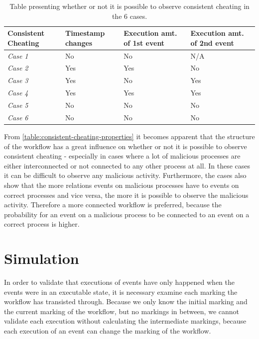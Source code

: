 	\begin{table}[H]
		\centering

		\begin{tabularx}{\textwidth}{XXXX}
			\textbf{Consistent Cheating\-} & \textbf{Timestamp changes\-} & \textbf{Execution amt. of 1st event} & \textbf{Execution amt. of 2nd event} \\\hline
			\textit{Case 1} & No & No & N/A \\
			\textit{Case 2} & Yes & Yes & No \\
			\textit{Case 3} & Yes & No & Yes \\
			\textit{Case 4} & Yes & Yes & Yes \\
			\textit{Case 5} & No & No & No \\
			\textit{Case 6} & No & No & No \\
		\end{tabularx}
		\caption{Table presenting whether or not it is possible to observe consistent cheating in the 6 cases.}
		\label{table:consistent-cheating-properties}
	\end{table}

	\noindent From \autoref{table:consistent-cheating-properties} it becomes apparent that the structure of the workflow has a great influence on whether or not it is possible to observe consistent cheating - especially in cases where a lot of malicious processes are either interconnected or not connected to any other process at all. In these cases it can be difficult to observe any malicious activity. Furthermore, the cases also show that the more relations events on malicious processes have to events on correct processes and vice versa, the more it is possible to observe the malicious activity. Therefore a more connected workflow is preferred, because the probability for an event on a malicious process to be connected to an event on a correct process is higher.

    \section{Simulation}\label{sec:validation:simulation}
    In order to validate that executions of events have only happened when the events were in an executable state, it is necessary examine each marking the workflow has transisted through. Because we only know the initial marking and the current marking of the workflow, but no markings in between, we cannot validate  each execution without calculating the intermediate markings, because each execution of an event can change the marking of the workflow.
    
